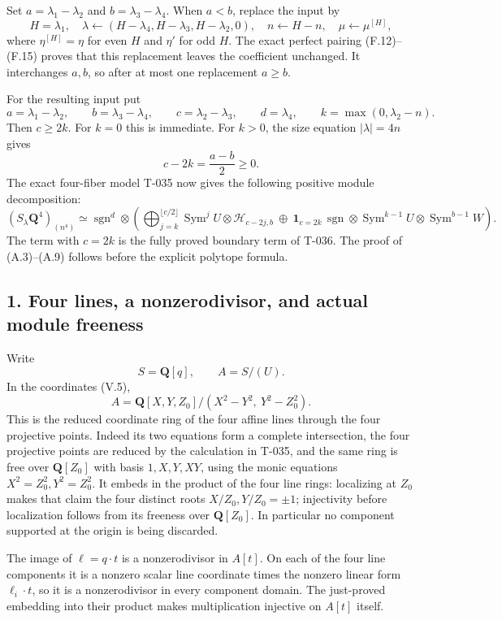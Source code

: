 \documentclass[
  10pt,
]{article}
\begin{document}
Set \(a=\lambda_1-\lambda_2\) and \(b=\lambda_3-\lambda_4\). When
\(a<b\), replace the input by \[
H=\lambda_1,\quad
\lambda\longleftarrow(H-\lambda_4,H-\lambda_3,H-\lambda_2,0),
\quad n\longleftarrow H-n,
\quad \mu\longleftarrow\mu^{[H]},
\tag{A.6}
\] where \(\eta^{[H]}=\eta\) for even \(H\) and \(\eta'\) for odd \(H\).
The exact perfect pairing (F.12)--(F.15) proves that this replacement
leaves the coefficient unchanged. It interchanges \(a,b\), so after at
most one replacement \(a\ge b\).

For the resulting input put \[
a=\lambda_1-\lambda_2,\qquad b=\lambda_3-\lambda_4,\qquad
c=\lambda_2-\lambda_3,\qquad d=\lambda_4,\qquad
k=\max(0,\lambda_2-n).
\tag{A.7}
\] Then \(c\ge2k\). For \(k=0\) this is immediate. For \(k>0\), the size
equation \(|\lambda|=4n\) gives \[
c-2k=\frac{a-b}{2}\ge0.
\tag{A.8}
\] The exact four-fiber model T-035 now gives the following positive
module decomposition: \[
\boxed{
(S_\lambda\mathbf Q^4)_{(n^4)}
\simeq \operatorname{sgn}^d\otimes
\left(
\bigoplus_{j=k}^{\lfloor c/2\rfloor}
\operatorname{Sym}^jU\otimes\mathcal H_{c-2j,b}
\ \oplus\
\mathbf1_{c=2k}\,
\operatorname{sgn}\otimes
\operatorname{Sym}^{k-1}U\otimes\operatorname{Sym}^{b-1}W
\right).}
\tag{A.9}
\] The term with \(c=2k\) is the fully proved boundary term of T-036.
The proof of (A.3)--(A.9) follows before the explicit polytope formula.

\subsection{1. Four lines, a nonzerodivisor, and actual module
freeness}\label{four-lines-a-nonzerodivisor-and-actual-module-freeness}

Write \[
S=\mathbf Q[q],\qquad A=S/(U).
\] In the coordinates (V.5), \[
A=\mathbf Q[X,Y,Z_0]/(X^2-Y^2,\ Y^2-Z_0^2).
\tag{A.10}
\] This is the reduced coordinate ring of the four affine lines through
the four projective points. Indeed its two equations form a complete
intersection, the four projective points are reduced by the calculation
in T-035, and the same ring is free over \(\mathbf Q[Z_0]\) with basis
\(1,X,Y,XY\), using the monic equations \(X^2=Z_0^2,Y^2=Z_0^2\). It
embeds in the product of the four line rings: localizing at \(Z_0\)
makes that claim the four distinct roots \(X/Z_0,Y/Z_0=\pm1\);
injectivity before localization follows from its freeness over
\(\mathbf Q[Z_0]\). In particular no component supported at the origin
is being discarded.

The image of \(\ell=q\cdot t\) is a nonzerodivisor in \(A[t]\). On each
of the four line components it is a nonzero scalar line coordinate times
the nonzero linear form \(\ell_i\cdot t\), so it is a nonzerodivisor in
every component domain. The just-proved embedding into their product
makes multiplication injective on \(A[t]\) itself.
\end{document}
